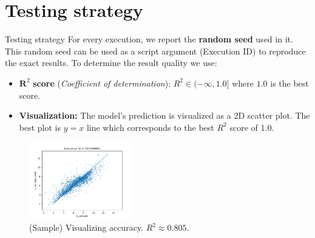 \documentclass{beamer}
\begin{document}
\section{Testing strategy}

\begin{frame}[t]{Testing strategy}
For every execution, we report the \textbf{random seed} used in it.
This random seed can be used as a script argument (Execution ID) to reproduce the exact results. To determine the result quality we use:

\begin{itemize}
\item $\mathbf{R}^2$ \textbf{score} (\textit{Coefficient of determination}): $R^2  \in (- \infty, 1.0]$ where $1.0$ is the best score. 
\item \textbf{Visualization:}
The model's prediction is visualized as a 2D scatter plot. 
The best plot is $y = x$ line which corresponds to the best $R^2$ score of 1.0.

\end{itemize}

\begin{figure}[htb]
  \centering
    \includegraphics[width=0.40\textwidth]{images/accuracy_validate}
    \caption{(Sample) Visualizing accuracy.  $R^2 \approx 0.805$.}
    \label{fig:modelQualityVisualization}
\end{figure}

\end{frame}
\end{document}
